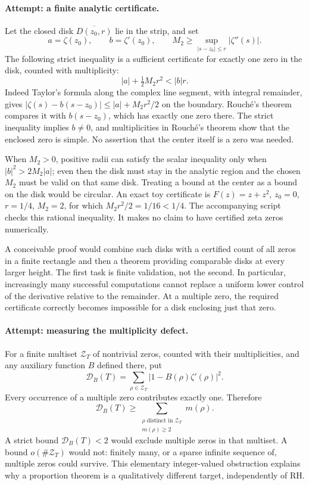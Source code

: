 \documentclass[11pt,a4paper]{article}
\numberwithin{equation}{section}
\begin{document}
\paragraph{Attempt: a finite analytic certificate.}
Let the closed disk $\overline{D(z_0,r)}$ lie in the strip, and set
\[
 a=\zeta(z_0),\qquad b=\zeta'(z_0),\qquad
 M_2\ge\sup_{|s-z_0|\le r}|\zeta''(s)|.
\]
The following strict inequality is a sufficient certificate for exactly one
zero in the disk, counted with multiplicity:
\begin{equation}\label{eq171-rouche}
                    |a|+\tfrac12M_2r^2<|b|r.
\end{equation}
Indeed Taylor's formula along the complex line segment, with integral
remainder, gives
$|\zeta(s)-b(s-z_0)|\le |a|+M_2r^2/2$ on the boundary. Rouch\'e's
 theorem compares it with $b(s-z_0)$, which has exactly one zero there.
The strict inequality implies $b\ne0$, and multiplicities in Rouch\'e's
 theorem show that the enclosed zero is simple. No assertion that the
center itself is a zero was needed.

When $M_2>0$, positive radii can satisfy the scalar inequality only when
$|b|^2>2M_2|a|$; even then the disk must stay in the analytic region and
the chosen $M_2$ must be valid on that same disk. Treating a bound at the
center as a bound on the disk would be circular. An exact toy certificate
is $F(z)=z+z^2$, $z_0=0$, $r=1/4$, $M_2=2$, for which
$M_2r^2/2=1/16<1/4$. The accompanying script checks this rational
inequality. It makes no claim to have certified zeta zeros numerically.

A conceivable proof would combine such disks with a certified count of all
zeros in a finite rectangle and then a theorem providing comparable disks
at every larger height. The first task is finite validation, not the second.
In particular, increasingly many successful computations cannot replace a
uniform lower control of the derivative relative to the remainder.
At a multiple zero, the required certificate correctly becomes impossible
for a disk enclosing just that zero.

\paragraph{Attempt: measuring the multiplicity defect.}
For a finite multiset $\mathcal Z_T$ of nontrivial zeros, counted with their
multiplicities, and any auxiliary function $B$ defined there, put
\[
 \mathcal D_B(T)=\sum_{\rho\in\mathcal Z_T}
                          |1-B(\rho)\zeta'(\rho)|^2.
\]
Every occurrence of a multiple zero contributes exactly one. Therefore
\begin{equation}\label{eq171-defect}
 \mathcal D_B(T)\ge
 \sum_{\substack{\rho\text{ distinct in }\mathcal Z_T\\m(\rho)\ge2}}m(\rho).
\end{equation}
A strict bound $\mathcal D_B(T)<2$ would exclude multiple zeros in that
multiset. A bound $o(\#\mathcal Z_T)$ would not: finitely many, or a sparse
infinite sequence of, multiple zeros could survive. This elementary
integer-valued obstruction explains why a proportion theorem is a
qualitatively different target, independently of RH.
\end{document}
